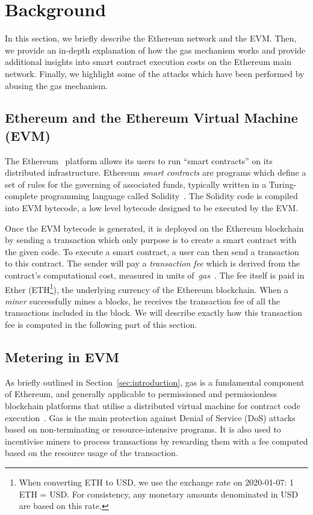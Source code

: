 \section{Background}
\label{sec:background}
In this section, we briefly describe the Ethereum network and the EVM. Then, we provide an in-depth explanation of how the gas mechanism works and provide additional insights into smart contract execution costs on the Ethereum main network. Finally, we highlight some of the attacks which have been performed by abusing the gas mechanism.

\subsection{Ethereum and the Ethereum Virtual Machine (EVM)}
The Ethereum~\cite{Buterin2014} platform allows its users to run ``smart contracts'' on its distributed infrastructure. Ethereum \emph{smart contracts} are programs which define a set of rules for the governing of associated funds, typically written in a Turing-complete programming language called Solidity~\cite{Dannen:2017:IES:3103305}. The Solidity code is compiled into EVM bytecode, a low level bytecode designed to be executed by the EVM.

Once the EVM bytecode is generated, it is deployed on the Ethereum blockchain by sending a transaction which only purpose is to create a smart contract with the given code. To execute a smart contract, a user can then send a transaction to this contract. The sender will pay a \emph{transaction fee} which is derived from the contract's computational cost, measured in units of~\emph{gas}~\cite{wood2014ethereum}. The fee itself is paid in Ether (ETH\footnote{When converting ETH to USD, we use the exchange rate on 2020-01-07: 1 ETH = \ETHRate{} USD. For consistency, any monetary amounts denominated in USD are based on this rate.}), the underlying currency of the Ethereum blockchain. When a \emph{miner} successfully mines a blocks, he receives the transaction fee of all the transactions included in the block. We will describe exactly how this transaction fee is computed in the following part of this section.

\subsection{Metering in EVM}
As briefly outlined in Section~\ref{sec:introduction}, gas is a fundamental component of Ethereum, and generally applicable to permissioned and permissionless blockchain platforms that utilise a distributed virtual machine for contract code execution~\cite{tezos-about,eosio-about}. Gas is the main protection against Denial of Service (DoS) attacks based on non-terminating or resource-intensive programs. It is also used to incentivise miners to process transactions by rewarding them with a fee computed based on the resource usage of the transaction.

